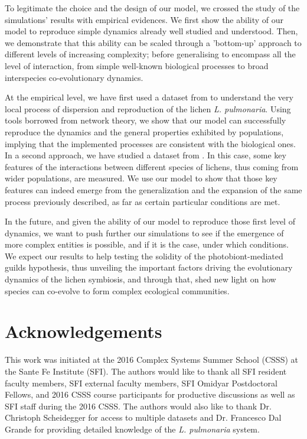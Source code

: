 \documentclass[runningheads,a4paper]{llncs}
\begin{document}
To legitimate the choice and the design of our model, we crossed the study of the simulations' results with empirical evidences. We first show the ability of our model to reproduce simple dynamics already well studied and understood. Then, we demonstrate that this ability can be scaled through a 'bottom-up' approach to different levels of increasing complexity; before generalising to encompass all the level of interaction, from simple well-known biological processes to broad interspecies co-evolutionary dynamics.

At the empirical level, we have first used a dataset from \cite{dal2012vertical} to understand the very local process of dispersion and reproduction of the lichen {\em L. pulmonaria}.
Using tools borrowed from network theory, we show that our model can successfully reproduce the dynamics and the general properties exhibited by populations, implying that the implemented processes are consistent with the biological ones. In a second approach, we have studied a dataset from \cite{dal2014molecular}. In this case, some key features of the interactions between different species of lichens, thus coming from wider populations, are measured. We use our model to show that those key features can indeed emerge from the generalization and the expansion of the same process previously described, as far as certain particular conditions are met. 

In the future, and given the ability of our model to reproduce those first level of dynamics, we want to push further our simulations to see if the emergence of more complex entities is possible, and if it is the case, under which conditions. We expect our results to help testing the solidity of the photobiont-mediated guilds hypothesis, thus unveiling the important factors driving the evolutionary dynamics of the lichen symbiosis, and through that, shed new light on how species can co-evolve to form complex ecological communities.

\section*{Acknowledgements}
This work was initiated at the 2016 Complex Systems Summer School (CSSS) at the Sante Fe Institute (SFI). The authors would like to thank all SFI resident faculty members, SFI external faculty members, SFI Omidyar Postdoctoral Fellows, and 2016 CSSS course participants for productive discussions as well as SFI staff during the 2016 CSSS. The authors would also like to thank Dr. Christoph Scheidegger for access to multiple datasets and Dr. Francesco Dal Grande for providing detailed knowledge of the \emph{L. pulmonaria} system. 



\end{document}
